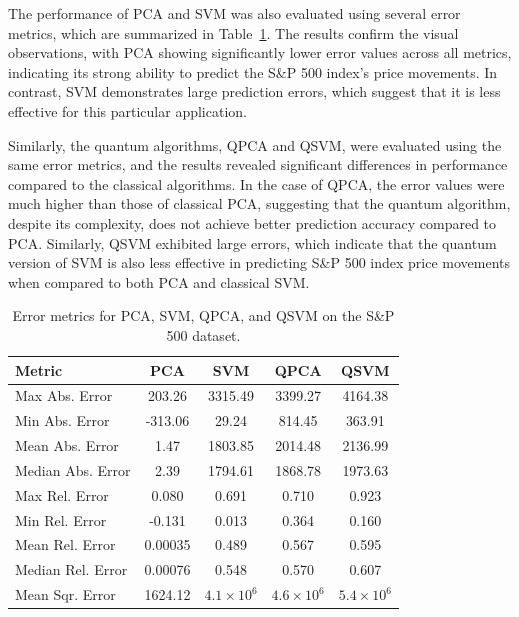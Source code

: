 \documentclass[journal]{IEEEtran}
\begin{document}
The performance of PCA and SVM was also evaluated using several error metrics, which are summarized in Table~\ref{tab:error_metrics}. The results confirm the visual observations, with PCA showing significantly lower error values across all metrics, indicating its strong ability to predict the S\&P 500 index's price movements. In contrast, SVM demonstrates large prediction errors, which suggest that it is less effective for this particular application.

Similarly, the quantum algorithms, QPCA and QSVM, were evaluated using the same error metrics, and the results revealed significant differences in performance compared to the classical algorithms. In the case of QPCA, the error values were much higher than those of classical PCA, suggesting that the quantum algorithm, despite its complexity, does not achieve better prediction accuracy compared to PCA. Similarly, QSVM exhibited large errors, which indicate that the quantum version of SVM is also less effective in predicting S\&P 500 index price movements when compared to both PCA and classical SVM.

\begin{table}[ht!]
    \centering
    \begin{tabular}{|l|c|c|c|c|}
        \hline
        \textbf{Metric} & \textbf{PCA} & \textbf{SVM} & \textbf{QPCA} & \textbf{QSVM} \\
        \hline
        Max Abs. Error & 203.26 & 3315.49 & 3399.27 & 4164.38 \\
        Min Abs. Error & -313.06 & 29.24 & 814.45 & 363.91 \\
        Mean Abs. Error & 1.47 & 1803.85 & 2014.48 & 2136.99 \\
        Median Abs. Error & 2.39 & 1794.61 & 1868.78 & 1973.63 \\
        Max Rel. Error & 0.080 & 0.691 & 0.710 & 0.923 \\
        Min Rel. Error & -0.131 & 0.013 & 0.364 & 0.160 \\
        Mean Rel. Error & 0.00035 & 0.489 & 0.567 & 0.595 \\
        Median Rel. Error & 0.00076 & 0.548 & 0.570 & 0.607 \\
        Mean Sqr. Error & 1624.12 & $4.1 \times 10^6$ & $4.6 \times 10^6$ & $5.4 \times 10^6$ \\
        \hline
    \end{tabular}
    \vspace{2.4em}
    \caption{Error metrics for PCA, SVM, QPCA, and QSVM on the S\&P 500 dataset.}
    \label{tab:error_metrics}
\end{table}
\end{document}
